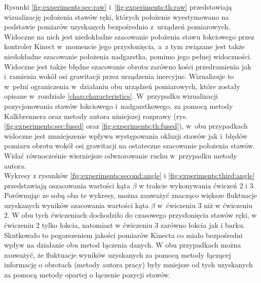Rysunki \ref{fig:experiments:sec:raw} i~\ref{fig:experiments:th:raw} przedstawiają wizualizację położenia stawów ręki, których położenie wyestymowano na podstawie pomiarów uzyskanych bezpośrednio z~urządzeń pomiarowych. Widoczne na nich jest niedokładne szacowanie położenia stawu łokciowego przez kontroler Kinect w~momencie jego przysłonięcia, a~z tym związane jest także niedokładne szacowanie położenia nadgarstka, pomimo jego pełnej widoczności. Widoczne jest także błędne szacowanie obrotu zarówno kości przedramienia jak i~ramienia wokół osi grawitacji przez urządzenia inercyjne. Wizualizuje to w~pełni ograniczenia w~działaniu obu urządzeń pomiarowych, które zostały opisane w~rozdziale \ref{chap:characteristics}. W~przypadku wizualizacji pozycjonowania stawów łokciowego i~nadgarstkowego, za pomocą metody Kalkbrennera oraz metody autora niniejszej rozprawy (rys. \ref{fig:experiments:sec:fused} oraz \ref{fig:experiments:th:fused}), w~obu przypadkach widoczne jest zmniejszenie wpływu występowania okluzji stawów jak i~błędów pomiaru obrotu wokół osi grawitacji na ostateczne szacowanie położenia stawów. Widać równocześnie wierniejsze odwzorowanie ruchu w~przypadku metody autora.\\
				
Wykresy z rysunków \ref{fig:experiments:second:angle} i \ref{fig:experiments:third:angle} przedstawiają oszacowania wartości kąta $\beta$ w trakcie wykonywania ćwiczeń 2 i 3. Porównując ze sobą oba te wykresy, można zauważyć znacząco większe fluktuacje uzyskanych wyników szacowania wartości kąta $\beta$ w~ćwiczeniu 3 niż w ćwiczeniu 2. W obu tych ćwiczeniach dochodziło do czasowego przysłonięcia stawów ręki, w ćwiczeniu 2 tylko łokcia, natomiast w ćwiczeniu 3 zarówno łokcia jak i barku. Skutkowało to pogorszeniem jakości pomiarów Kinecta co miało bezpośredni wpływ na działanie obu metod łączenia danych. W obu przypadkach można zauważyć, że fluktuacje wyników uzyskanych za pomocą metody łączącej informację o obrotach (metody autora pracy) były mniejsze od tych uzyskanych za pomocą metody opartej o łączenie pozycji stawów.
				
